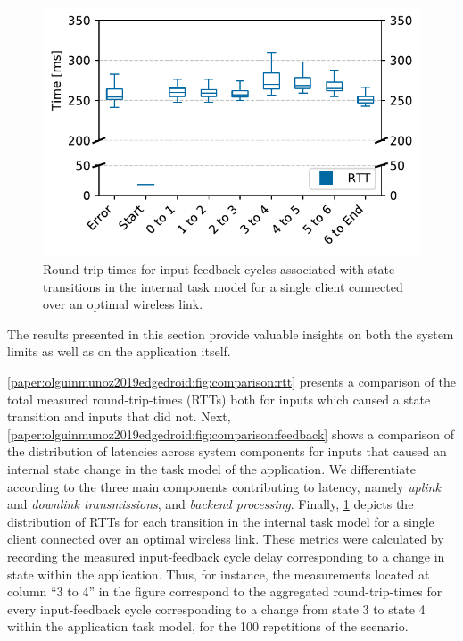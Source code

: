 \begin{figure}%
    \centering%
    \includegraphics[width=.85\columnwidth]{publications/2019EdgeDroid/plots/comparison/nofonts/box_taskstep}%
    \caption{Round-trip-times for input-feedback cycles associated with state transitions in the internal task model for a single client connected over an optimal wireless link.}%
    \label{paper:olguinmunoz2019edgedroid:fig:comparison:tasksteps}
\end{figure}%

The results presented in this section provide valuable insights on both the system limits as well as on the application itself.

\cref{paper:olguinmunoz2019edgedroid:fig:comparison:rtt} presents a comparison of the total measured round-trip-times (RTTs) both for inputs which caused a state transition and inputs that did not.
Next, \cref{paper:olguinmunoz2019edgedroid:fig:comparison:feedback} shows a comparison of the distribution of latencies across system components for inputs that caused an internal state change in the task model of the application.
We differentiate according to the three main components contributing to latency, namely \emph{uplink} and \emph{downlink transmissions}, and \emph{backend processing}.
Finally, \cref{paper:olguinmunoz2019edgedroid:fig:comparison:tasksteps} depicts the distribution of RTTs for each transition in the internal task model for a single client connected over an optimal wireless link.
These metrics were calculated by recording the measured input-feedback cycle delay corresponding to a change in state within the application.
Thus, for instance, the measurements located at column ``3 to 4'' in the figure correspond to the aggregated round-trip-times for every input-feedback cycle corresponding to a change from state 3 to state 4 within the application task model, for the 100 repetitions of the scenario.


